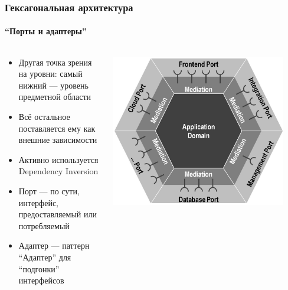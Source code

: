 \documentclass{../../slides-style}
\begin{document}
    \begin{frame}
        \frametitle{Гексагональная архитектура}
        \framesubtitle{``Порты и адаптеры''}
        \begin{columns}
            \begin{column}{0.6\textwidth}
                \begin{itemize}
                    \item Другая точка зрения на уровни: самый нижний --- уровень предметной области
                    \item Всё остальное поставляется ему как внешние зависимости
                    \item Активно используется Dependency Inversion
                    \item Порт --- по сути, интерфейс, предоставляемый или потребляемый
                    \item Адаптер --- паттерн ``Адаптер'' для ``подгонки'' интерфейсов
                \end{itemize}
            \end{column}
            \begin{column}{0.4\textwidth}
                \begin{center}
                    \includegraphics[width=0.9\textwidth]{hexagonalArchitecture.png}
                \end{center}
            \end{column}
        \end{columns}
    \end{frame}
\end{document}
